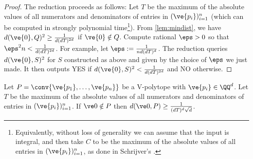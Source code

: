 \begin{proof}
The reduction proceeds as follows:
Let $T$ be the maximum of the absolute values of all numerators and denominators of entries in $(\ve{p_i})_{i=1}^n$ (which can be computed in strongly polynomial time\footnote{Equivalently, without loss of generality we can assume that the input is integral, and then take $C$ to be the maximum of the absolute values of all entries in $(\ve{p_i})_{i=1}^n$, as done in Schrijver's \cite[Section 15.2]{schrijver98}.}).
From \cref{lem:mindist}, we have $d(\ve{0},Q)^2 \geq \frac{1}{d (dT)^{2d}}$ if $\ve{0} \notin Q$.
Compute rational $\eps > 0$ so that $\eps^2 n < \frac{1}{d (dT)^{2d}}$. 
For example, let $\eps := \frac{1}{nd (dT)^d}$.
The reduction queries $d(\ve{0},S)^2$ for $S$ constructed as above and given by the choice of $\eps$ we just made. It then outputs YES if $d(\ve{0},S)^2 < \frac{1}{d (dT)^{2d}}$ and NO otherwise.
%
\end{proof}

\begin{lemma}\label{lem:mindist}
Let $P = \conv \{\ve{p_1}, \dotsc, \ve{p_n} \}$ be a V-polytope with $\ve{p_i} \in \QQ^d$. 
Let $T$ be the maximum of the absolute values of all numerators and denominators of entries in $(\ve{p_i})_{i=1}^n$.
If $\ve 0 \notin P$ then $d(\ve 0, P) \geq \frac{1}{ (dT)^{d} \sqrt{d}}$.
\end{lemma}


